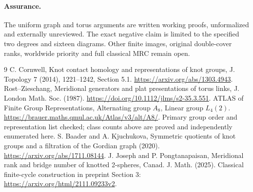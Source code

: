 \documentclass[11pt]{article}
\begin{document}
\paragraph{Assurance.}
The uniform graph and torus arguments are written working
proofs, unformalized and externally unreviewed. The exact
negative claim is limited to the specified two degrees and
sixteen diagrams. Other finite images, original double-cover
ranks, worldwide priority and full classical MRC remain open.

\begin{thebibliography}{9}
\small
{} C. Cornwell, Knot contact homology and
representations of knot groups, J. Topology 7 (2014),
1221--1242, Section 5.1.
\url{https://arxiv.org/abs/1303.4943}.
 Rost--Zieschang, Meridional generators and plat
presentations of torus links, J. London Math. Soc. (1987).
\url{https://doi.org/10.1112/jlms/s2-35.3.551}.
 ATLAS of Finite Group Representations,
Alternating group $A_8$, Linear group $L_4(2)$.
\url{https://brauer.maths.qmul.ac.uk/Atlas/v3/alt/A8/}.
Primary group order and representation list checked; class
counts above are proved and independently enumerated here.
 S. Baader and A. Kjuchukova, Symmetric quotients of
knot groups and a filtration of the Gordian graph (2020).
\url{https://arxiv.org/abs/1711.08144}.
 J. Joseph and P. Pongtanapaisan, Meridional rank
and bridge number of knotted 2-spheres, Canad. J. Math. (2025).
Classical finite-cycle construction in preprint Section 3:
\url{https://arxiv.org/html/2111.09233v2}.
\end{thebibliography}
\end{document}
